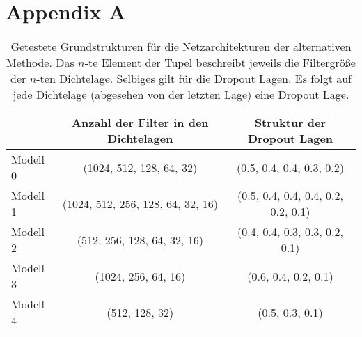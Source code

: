 \chapter{Appendix A}
\Blindtext

\begin{table}
  \centering%
  \begin{tabular}{l
                  c
                  c}
      \toprule
      {}    & Anzahl der Filter in den Dichtelagen  & Struktur der Dropout Lagen      \\
      \midrule
      Modell 0    & (1024, 512, 128, 64, 32)  & (0.5, 0.4, 0.4, 0.3, 0.2) \\
      Modell 1    & (1024, 512, 256, 128, 64, 32, 16)  & (0.5, 0.4, 0.4, 0.4, 0.2, 0.2, 0.1) \\
      Modell 2    & (512, 256, 128, 64, 32, 16)  & (0.4, 0.4, 0.3, 0.3, 0.2, 0.1) \\
      Modell 3    & (1024, 256, 64, 16)  & (0.6, 0.4, 0.2, 0.1) \\
      Modell 4    & (512, 128, 32)  & (0.5, 0.3, 0.1) \\
      \bottomrule
  \end{tabular}
  \caption{Getestete Grundstrukturen für die Netzarchitekturen der alternativen Methode. Das $n$-te Element der Tupel beschreibt jeweils die Filtergröße der $n$-ten Dichtelage. Selbiges gilt für die Dropout Lagen. Es folgt auf jede Dichtelage (abgesehen von der letzten Lage) eine Dropout Lage.}
  \label{tab:grid}
\end{table}
%
